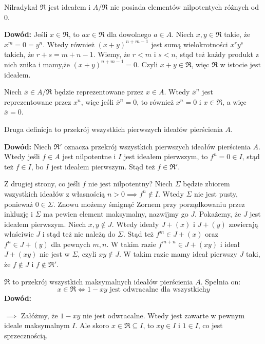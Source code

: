  Nilradykał $\mathfrak{R}$ jest ideałem i $A/\mathfrak{R}$ nie posiada elementów nilpotentych różnych od $0$.

\textbf{Dowód:} Jeśli $x\in\mathfrak{R}$, to $ax\in\mathfrak{R}$ dla dowolnego $a\in A$. Niech $x, y\in\mathfrak{R}$ takie, że $x^m=0=y^n$. Wtedy również $(x+y)^{n+m-1}$ jest sumą wielokrotności $x^ry^s$ takich, że $r+s=m+n-1$. Wiemy, że $r<m$ i $s<n$, stąd też każdy produkt z nich znika i mamy,że $(x+y)^{n+m-1}=0$. Czyli $x+y\in\mathfrak{R}$, więc $\mathfrak{R}$ w istocie jest ideałem.

Niech $\overline x\in A/\mathfrak{R}$ będzie reprezentowane przez $x\in A$. Wtedy $\overline x^n$ jest reprezentowane przez $x^n$, więc jeśli $\overline x^n=0$, to również $x^n=0$ i $x\in\mathfrak{R}$, a więc $\overline x=0$.

\proofend

Druga definicja  to przekrój wszystkich pierwszych ideałów pierścienia $A$.

\textbf{Dowód:} Niech $\mathfrak{R}'$ oznacza przekrój wszystkich pierwszych ideałów pierścienia $A$. Wtedy jeśli $f\in A$ jest nilpotentne i $I$ jest ideałem pierwszym, to $f^n=0\in I$, stąd też $f\in I$, bo $I$ jest ideałem pierwszym. Stąd też $f\in\mathfrak{R}'$.

Z drugiej strony, co jeśli $f$ nie jest nilpotentny? Niech $\Sigma$ będzie zbiorem wszystkich ideałów z własnością $n>0\implies f^n\notin I$. Wtedy $\Sigma$ nie jest pusty, ponieważ $0\in\Sigma$. Znowu możemy śmignąć Zornem przy porządkowaniu przez inkluzję i $\Sigma$ ma pewien element maksymalny, nazwijmy go $J$. Pokażemy, że $J$ jest ideałem pierwszym. Niech $x,y\notin J$. Wtedy ideały $J+(x)$ i $J+(y)$ zawierają właściwie $J$ i stąd też nie należą do $\Sigma$. Stąd też $f^m\in J+(x)$ oraz $f^n\in J+(y)$ dla pewnych $m,n$. W takim razie $f^{m+n}\in J+(xy)$ i ideał $J+(xy)$ nie jest w $\Sigma$, czyli $xy\notin J$. W takim razie mamy ideał pierwszy $J$ taki, że $f\notin J$ i $f\notin\mathfrak{R}'$.

\proofend
\medskip

 $\mathfrak{R}$ to przekrój wszystkich maksymalnych ideałów pierścienia $A$. Spełnia on:
$$x\in\mathfrak{R}\iff 1-xy\text{ jest odwracalne dla wszystkich} y$$
\textbf{Dowód:} 

$\implies$ Załóżmy, że $1-xy$ nie jest odwracalne. Wtedy jest zawarte w pewnym ideale maksymalnym $I$. Ale skoro $x\in\mathfrak{R}\subseteq I$, to $xy\in I$ i $1\in I$, co jest sprzecznością.

